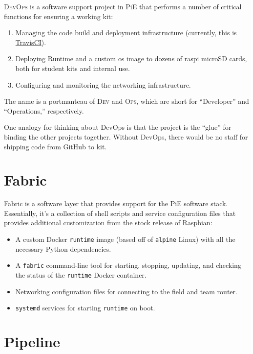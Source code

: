 \documentclass[12pt]{book}
\begin{document}
  \textsc{DevOps} is a software support project in PiE that performs a number of critical functions for ensuring a working kit:
  \begin{enumerate}
    \item Managing the code build and deployment infrastructure (currently, this is \href{https://travis-ci.org/pioneers/PieCentral}{TravisCI}).
    \item Deploying Runtime and a custom \gls{os} \gls{image} to dozens of \gls{raspi} microSD cards, both for student kits and internal use.
    \item Configuring and monitoring the networking infrastructure.
  \end{enumerate}

  The name is a portmanteau of \textsc{Dev} and \textsc{Ops}, which are short for ``Developer'' and ``Operations,'' respectively.

  One analogy for thinking about DevOps is that the project is the ``glue'' for binding the other projects together.
  Without DevOps, there would be no staff for shipping code from GitHub to kit.

  \section{Fabric}

  Fabric is a software layer that provides support for the PiE software stack.
  Essentially, it's a collection of shell scripts and service configuration files that provides additional customization from the stock release of Raspbian:
  \begin{itemize}
    \item A custom Docker \texttt{runtime} image (based off of \texttt{alpine} Linux) with all the necessary Python dependencies.
    \item A \texttt{fabric} command-line tool for starting, stopping, updating, and checking the status of the \texttt{runtime} Docker container.
    \item Networking configuration files for connecting to the field and team router.
    \item \texttt{systemd} services for starting \texttt{runtime} on boot.
  \end{itemize}

  \section{Pipeline}
\end{document}
